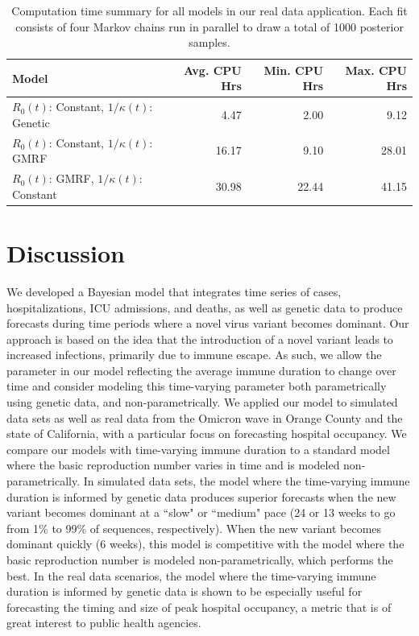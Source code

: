 \begin{table}
\caption[Computation time for models in real data application.]{Computation time summary for all models in our real data application.
Each fit consists of four Markov chains run in parallel to draw a total of 1000 posterior samples.}
\label{ch_5:table:real_data_cpu_time}
\centering
\begin{tabular}{lrrr}
 Model & Avg. CPU Hrs & Min. CPU Hrs & Max. CPU Hrs \\ 
  \hline
\( R_0(t) \): Constant, \( 1 / \kappa(t) \): Genetic & 4.47 & 2.00 & 9.12 \\ 
\( R_0(t) \): Constant, \( 1 / \kappa(t) \): GMRF & 16.17 & 9.10 & 28.01 \\ 
\( R_0(t) \): GMRF, \( 1 / \kappa(t) \): Constant & 30.98 & 22.44 & 41.15
\end{tabular}
\end{table}

\section{Discussion}
\label{ch_5:sec:discussion}

We developed a Bayesian model that integrates time series of cases, hospitalizations, ICU admissions, and deaths, as well as genetic data to produce forecasts during time periods where a novel virus variant becomes dominant.
Our approach is based on the idea that the introduction of a novel variant leads to increased infections, primarily due to immune escape.
As such, we allow the parameter in our model reflecting the average immune duration to change over time and consider modeling this time-varying parameter both parametrically using genetic data, and non-parametrically.
We applied our model to simulated data sets as well as real data from the Omicron wave in Orange County and the state of California, with a particular focus on forecasting hospital occupancy.
We compare our models with time-varying immune duration to a standard model where the basic reproduction number varies in time and is modeled non-parametrically.
In simulated data sets, the model where the time-varying immune duration is informed by genetic data produces superior forecasts when the new variant becomes dominant at a ``slow" or ``medium" pace (24 or 13 weeks to go from 1\% to 99\% of sequences, respectively).
When the new variant becomes dominant quickly (6 weeks), this model is competitive with the model where the basic reproduction number is modeled non-parametrically, which performs the best.
In the real data scenarios, the model where the time-varying immune duration is informed by genetic data is shown to be especially useful for forecasting the timing and size of peak hospital occupancy, a metric that is of great interest to public health agencies.

